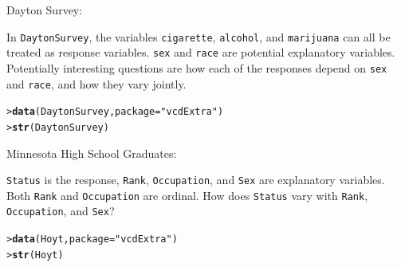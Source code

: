 \documentclass[11pt]{report}\usepackage[]{graphicx}\usepackage[]{color}
\makeatletter
\newcommand{\hlstr}[1]{\textcolor[rgb]{0.192,0.494,0.8}{#1}}%
\newcommand{\hlstd}[1]{\textcolor[rgb]{0.345,0.345,0.345}{#1}}%
\newcommand{\hlkwc}[1]{\textcolor[rgb]{0.333,0.667,0.333}{#1}}%
\newcommand{\hlkwd}[1]{\textcolor[rgb]{0.737,0.353,0.396}{\textbf{#1}}}%
\newenvironment{kframe}{%
 \def\at@end@of@kframe{}%
 \ifinner\ifhmode%
  \def\at@end@of@kframe{\end{minipage}}%
  \begin{minipage}{\columnwidth}%
 \fi\fi%
 \def\FrameCommand##1{\hskip\@totalleftmargin \hskip-\fboxsep
 \colorbox{shadecolor}{##1}\hskip-\fboxsep
     \hskip-\linewidth \hskip-\@totalleftmargin \hskip\columnwidth}%
 \MakeFramed {\advance\hsize-\width
   \@totalleftmargin\z@ \linewidth\hsize
   \@setminipage}}%
 {\par\unskip\endMakeFramed%
 \at@end@of@kframe}
\newenvironment{knitrout}{}{} %
\renewenvironment{knitrout}{\small\renewcommand{\baselinestretch}{.85}}{} %
\makeatother
\begin{document}
\begin{Exercises}
\begin{enumerate*}
    \item Dayton Survey: 
    \begin{ans}
      In \texttt{DaytonSurvey}, the variables \texttt{cigarette}, \texttt{alcohol}, and \texttt{marijuana} can all be treated as
      response variables.
      \texttt{sex} and \texttt{race} are potential explanatory variables. Potentially interesting questions are how
      each of the responses depend on \texttt{sex} and \texttt{race}, and how they vary jointly.
\begin{knitrout}
\color{fgcolor}\begin{kframe}
\begin{alltt}
\hlstd{> }\hlkwd{data}\hlstd{(DaytonSurvey,} \hlkwc{package}\hlstd{=}\hlstr{"vcdExtra"}\hlstd{)}
\hlstd{> }\hlkwd{str}\hlstd{(DaytonSurvey)}
\end{alltt}
\end{kframe}
\end{knitrout}
    \end{ans}
        
    \item Minnesota High School Graduates: 
    \begin{ans}
      \texttt{Status} is the response, \texttt{Rank}, \texttt{Occupation}, and \texttt{Sex} are explanatory variables. 
      Both \texttt{Rank} and \texttt{Occupation} are ordinal. How does \texttt{Status} vary with \texttt{Rank}, \texttt{Occupation}, and \texttt{Sex}?
\begin{knitrout}
\color{fgcolor}\begin{kframe}
\begin{alltt}
\hlstd{> }\hlkwd{data}\hlstd{(Hoyt,} \hlkwc{package}\hlstd{=}\hlstr{"vcdExtra"}\hlstd{)}
\hlstd{> }\hlkwd{str}\hlstd{(Hoyt)}
\end{alltt}
\end{kframe}
\end{knitrout}
    \end{ans}    
    
  \end{enumerate*}


\end{Exercises}
\end{document}
